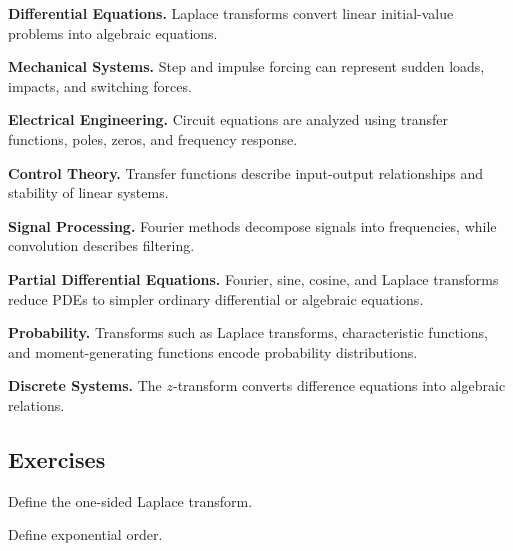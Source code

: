 \begin{applicationbox}

\textbf{Differential Equations.}
Laplace transforms convert linear initial-value problems into algebraic
equations.

\medskip

\textbf{Mechanical Systems.}
Step and impulse forcing can represent sudden loads, impacts, and
switching forces.

\medskip

\textbf{Electrical Engineering.}
Circuit equations are analyzed using transfer functions, poles, zeros,
and frequency response.

\medskip

\textbf{Control Theory.}
Transfer functions describe input-output relationships and stability of
linear systems.

\medskip

\textbf{Signal Processing.}
Fourier methods decompose signals into frequencies, while convolution
describes filtering.

\medskip

\textbf{Partial Differential Equations.}
Fourier, sine, cosine, and Laplace transforms reduce PDEs to simpler
ordinary differential or algebraic equations.

\medskip

\textbf{Probability.}
Transforms such as Laplace transforms, characteristic functions, and
moment-generating functions encode probability distributions.

\medskip

\textbf{Discrete Systems.}
The \(z\)-transform converts difference equations into algebraic
relations.

\end{applicationbox}

\subsection{Exercises}
\label{subsec:transform-method-exercises}

\begin{exercise}[1]
Define the one-sided Laplace transform.
\end{exercise}

\begin{exercise}[1]
Define exponential order.
\end{exercise}


